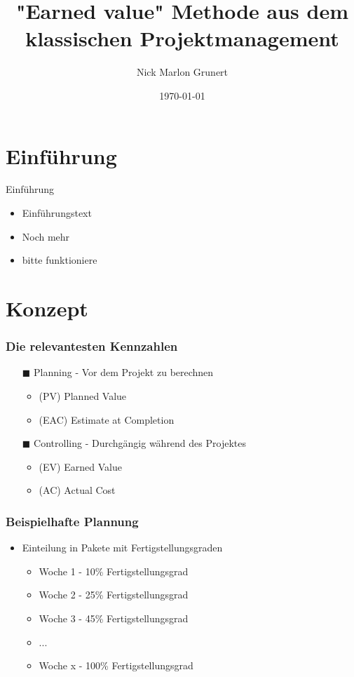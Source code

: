 \documentclass{f4_beamer}
\title{"Earned value" Methode aus dem klassischen Projektmanagement}
\author{Nick Marlon Grunert}
\date{\today}
\begin{document}
\section{Einführung}

\begin{frame}{Einführung}
    \begin{itemize}
        \item Einführungstext
        \item Noch mehr
        \item bitte funktioniere
    \end{itemize}
\end{frame}

%
%


\section{Konzept}
\begin{frame}[fragile]
    \frametitle{Die relevantesten Kennzahlen}
    \Large
    \begin{itemize}
        \item[$\blacksquare$] Planning - Vor dem Projekt zu berechnen
        \begin{itemize}
            \item (PV)  Planned Value
            \item (EAC) Estimate at Completion
        \end{itemize}
        \item[$\blacksquare$] Controlling - Durchgängig während des Projektes
        \begin{itemize}
            \item (EV)  Earned Value
            \item (AC)  Actual Cost
        \end{itemize}
    \end{itemize}
\end{frame}
\begin{frame}[fragile]
    \frametitle{Beispielhafte Plannung}
    \begin{itemize}
        \item Einteilung in Pakete mit Fertigstellungsgraden
        \begin{itemize}
            \item Woche 1 - 10\% Fertigstellungsgrad
            \item Woche 2 - 25\% Fertigstellungsgrad
            \item Woche 3 - 45\% Fertigstellungsgrad
            \item ...
            \item Woche x - 100\% Fertigstellungsgrad
        \end{itemize}
    \end{itemize}
\end{frame}
\end{document}
